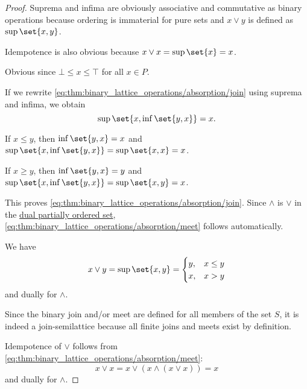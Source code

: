 \begin{proof}
   Suprema and infima are obviously associative and commutative as binary operations because ordering is immaterial for pure sets and \( x \vee y \) is defined as \( \sup\set{ x, y } \).

  Idempotence is also obvious because \( x \vee x = \sup\set{ x } = x \).

   Obvious since \( \bot \leq x \leq \top \) for all \( x \in P \).

   If we rewrite \eqref{eq:thm:binary_lattice_operations/absorption/join} using suprema and infima, we obtain
  \begin{equation*}
    \sup\set{ x, \inf\set{ y, x } } = x.
  \end{equation*}

  If \( x \leq y \), then \( \inf\set{ y, x } = x \) and \( \sup\set{ x, \inf\set{ y, x } } = \sup\set{ x, x } = x \).

  If \( x \geq y \), then \( \inf\set{ y, x } = y \) and \( \sup\set{ x, \inf\set{ y, x } } = \sup\set{ x, y } = x \).

  This proves \eqref{eq:thm:binary_lattice_operations/absorption/join}. Since \( \wedge \) is \( \vee \) in the \hyperref[def:preordered_set/duality]{dual partially ordered set}, \eqref{eq:thm:binary_lattice_operations/absorption/meet} follows automatically.

   We have
  \begin{equation*}
    x \vee y
    =
    \sup\set{ x, y }
    =
    \begin{cases}
      y, &x \leq y \\
      x, &x > y
    \end{cases}
  \end{equation*}
  and dually for \( \wedge \).

   Since the binary join and/or meet are defined for all members of the set \( S \), it is indeed a join-semilattice because all finite joins and meets exist by definition.

  Idempotence of \( \vee \) follows from \eqref{eq:thm:binary_lattice_operations/absorption/meet}:
  \begin{equation*}
    x \vee x = x \vee (x \wedge (x \vee x)) = x
  \end{equation*}
  and dually for \( \wedge \).
\end{proof}

